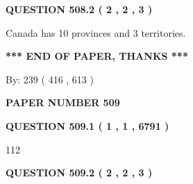 \documentclass[12pt]{article}
\begin{document}
 
  
\vspace{0.2in}
  
{\textbf{\Large{QUESTION
508.2 
 ( 2 , 2 , 3 )
}}}
  
  
 
 
\noindent{}
 
 
Canada has 10  provinces and 3 territories.
 
 
 
 
   
   
 \vspace{0.2in}
 
   
   
   
   
\vspace{1.0in} 
{\textbf{\large{ *** END OF PAPER, THANKS *** }}} 
   
   
\hspace{1.0in} By: 
 239 ( 416 ,  613 )
   
   
   
   
\newpage 
\setcounter{page}{ 
   509001 } 
   
   
   
   
 {\textbf{ \Large{ PAPER NUMBER  509  }}}
   
   
\vspace{0.2in}
   
   
   
   
   
   
 \vspace{0.2in}
 
 
 
 
   
   
  
\vspace{0.2in}
  
{\textbf{\Large{QUESTION
509.1 
 ( 1 , 1 , 6791 )
}}}
  
  
 
 
\noindent{}

112
 
 
  
\vspace{0.2in}
  
{\textbf{\Large{QUESTION
509.2 
 ( 2 , 2 , 3 )
}}}
  
\end{document}
